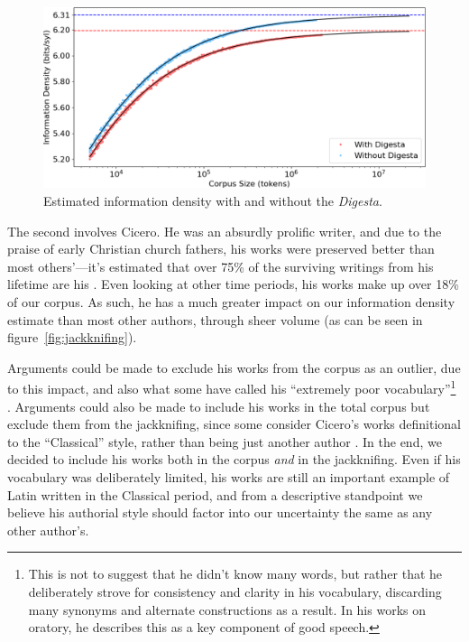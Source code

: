\documentclass[12pt,twoside]{article}
\begin{document}
\begin{figure}[h]
\centering
\caption{Estimated information density with and without the \emph{Digesta}.}
\label{fig:digesta}
\noindent\includegraphics[width=\linewidth]{digesta}
\end{figure}

The second involves Cicero. He was an absurdly prolific writer, and due to the praise of early Christian church fathers, his works were preserved better than most others'---it's estimated that over 75\% of the surviving writings from his lifetime are his \citep{harrison}. Even looking at other time periods, his works make up over 18\% of our corpus. As such, he has a much greater impact on our information density estimate than most other authors, through sheer volume (as can be seen in figure~\ref{fig:jackknifing}).

Arguments could be made to exclude his works from the corpus as an outlier, due to this impact, and also what some have called his ``extremely poor vocabulary''\footnote{This is not to suggest that he didn't know many words, but rather that he deliberately strove for consistency and clarity in his vocabulary, discarding many synonyms and alternate constructions as a result. In his works on oratory, he describes this as a key component of good speech.} \citep[136]{albrecht}. Arguments could also be made to include his works in the total corpus but exclude them from the jackknifing, since some consider Cicero's works definitional to the ``Classical'' style, rather than being just another author \citep[136]{albrecht}. In the end, we decided to include his works both in the corpus \emph{and} in the jackknifing. Even if his vocabulary was deliberately limited, his works are still an important example of Latin written in the Classical period, and from a descriptive standpoint we believe his authorial style should factor into our uncertainty the same as any other author's.
\end{document}
